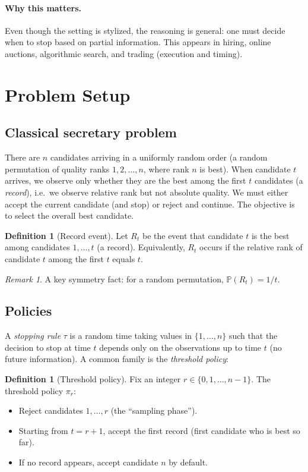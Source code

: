 \documentclass[11pt]{article}
\theoremstyle{plain}
\theoremstyle{definition}
\newtheorem{definition}[theorem]{Definition}
\theoremstyle{remark}
\newtheorem{remark}[theorem]{Remark}
\newcommand{\Prob}{\mathbb{P}}
\newcommand{\1}{\mathbf{1}}
\begin{document}
\paragraph{Why this matters.}
Even though the setting is stylized, the reasoning is general: one must decide when to stop based on partial
information. This appears in hiring, online auctions, algorithmic search, and trading (execution and timing).

\section{Problem Setup}
\subsection{Classical secretary problem}
There are $n$ candidates arriving in a uniformly random order (a random permutation of quality ranks
$1,2,\dots,n$, where rank $n$ is best). When candidate $t$ arrives, we observe only whether they are the
best among the first $t$ candidates (a \emph{record}), i.e.\ we observe relative rank but not absolute quality.
We must either accept the current candidate (and stop) or reject and continue. The objective is to select the
overall best candidate.

\begin{definition}[Record event]
Let $R_t$ be the event that candidate $t$ is the best among candidates $1,\dots,t$ (a record).
Equivalently, $R_t$ occurs if the relative rank of candidate $t$ among the first $t$ equals $t$.
\end{definition}

\begin{remark}
A key symmetry fact: for a random permutation, $\Prob(R_t)=1/t$.
\end{remark}

\subsection{Policies}
A \emph{stopping rule} $\tau$ is a random time taking values in $\{1,\dots,n\}$ such that the decision to stop
at time $t$ depends only on the observations up to time $t$ (no future information). A common family is the
\emph{threshold policy}:

\begin{definition}[Threshold policy]
Fix an integer $r\in\{0,1,\dots,n-1\}$. The threshold policy $\pi_r$:
\begin{itemize}
\item Reject candidates $1,\dots,r$ (the ``sampling phase'').
\item Starting from $t=r+1$, accept the first record (first candidate who is best so far).
\item If no record appears, accept candidate $n$ by default.
\end{itemize}
\end{definition}
\end{document}
